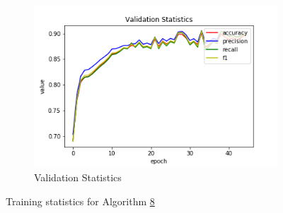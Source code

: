 \begin{figure}[h!]
\begin{subfigure}[b]{0.35\linewidth}
    \includegraphics[width=\linewidth]{images/cae_online_lstm/caelstm_section_lstm_training_house_10000_model_validation_stats.png}
     \caption{Validation Statistics}
  \end{subfigure}
  \caption{Training statistics for Algorithm \hyperref[tab: app_evalalgorithms]{8}}
  \label{fig: train_olnine_lstm_8}
\end{figure}

